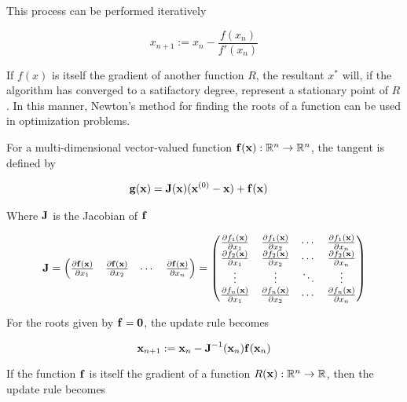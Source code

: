 \documentclass{article}
\newcommand{\R}{\mathbb{R}}
\newcommand{\vect}[1]{\textbf{\textrm{#1}}}
\newcommand{\pd}[2]{\frac{\partial {#1}}{\partial {#2}}}
\begin{document}
This process can be performed iteratively

\begin{equation} \label{updaterule1d}
	x_{n+1} := x_n - \frac{f(x_n)}{f'(x_n)}
\end{equation}

If $f(x)$ is itself the gradient of another function $R$, the resultant $x^*$ will, if the algorithm has converged to a satifactory degree, represent a stationary point of $R$. 
In this manner, Newton's method for finding the roots of a function can be used in optimization problems. \par 
\hfill \newline
For a multi-dimensional vector-valued function $\vect{f}(\vect{x}): \R^n \rightarrow \R^n$, the tangent is defined by

\begin{align} \label{tangent}
	\vect{g}(\vect{x}) & = \vect{J}(\vect{x})(\vect{x}^{(0)} - \vect{x}) + \vect{f}(\vect{x})
\end{align}

Where $\vect{J}$ is the Jacobian of $\vect{f}$

\begin{equation*}
	\vect{J} = 
	\begin{pmatrix}
		\pd{\vect{f}(\vect{x})}{x_1} & \pd{\vect{f}(\vect{x})}{x_2} & \cdots 
		& \pd{\vect{f}(\vect{x})}{x_n}
	\end{pmatrix} = 
	\begin{pmatrix}
		\pd{f_1(\vect{x})}{x_1} & \pd{f_1(\vect{x})}{x_2} & \cdots & \pd{f_1(\vect{x})}{x_n} \\
		\pd{f_2(\vect{x})}{x_1} & \pd{f_2(\vect{x})}{x_2} & \cdots & \pd{f_2(\vect{x})}{x_n} \\
		\vdots & \vdots & \ddots & \vdots \\
		\pd{f_n(\vect{x})}{x_1} & \pd{f_n(\vect{x})}{x_2} & \cdots & \pd{f_n(\vect{x})}{x_n}
	\end{pmatrix}
\end{equation*}

For the roots given by $\vect{f} = \vect{0}$, the update rule becomes

\begin{equation} \label{updaterule}
	\vect{x}_{n+1} := \vect{x}_n - \vect{J}^{-1}(\vect{x}_n)\vect{f}(\vect{x}_n)	
\end{equation}

If the function $\vect{f}$ is itself the gradient of a function $R(\vect{x}): \R^n \rightarrow \R$, then the update rule becomes
\end{document}
